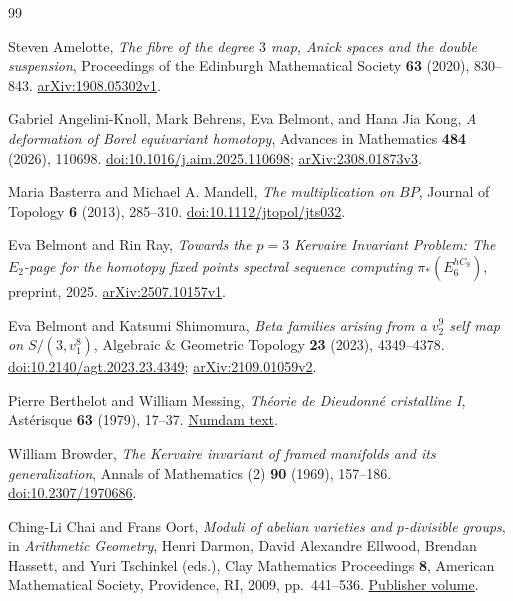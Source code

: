 \documentclass[11pt]{article}
\theoremstyle{definition}
\theoremstyle{remark}
\numberwithin{equation}{section}
\begin{document}
\begin{thebibliography}{99}

Steven Amelotte,
\emph{The fibre of the degree $3$ map, Anick spaces and the double suspension},
Proceedings of the Edinburgh Mathematical Society \textbf{63} (2020),
830--843.
\href{https://arxiv.org/abs/1908.05302v1}{arXiv:1908.05302v1}.

Gabriel Angelini-Knoll, Mark Behrens, Eva Belmont, and Hana Jia Kong,
\emph{A deformation of Borel equivariant homotopy},
Advances in Mathematics \textbf{484} (2026), 110698.
\href{https://doi.org/10.1016/j.aim.2025.110698}{doi:10.1016/j.aim.2025.110698};
\href{https://arxiv.org/abs/2308.01873v3}{arXiv:2308.01873v3}.

Maria Basterra and Michael A. Mandell,
\emph{The multiplication on $BP$},
Journal of Topology \textbf{6} (2013), 285--310.
\href{https://doi.org/10.1112/jtopol/jts032}{doi:10.1112/jtopol/jts032}.

Eva Belmont and Rin Ray,
\emph{Towards the $p=3$ Kervaire Invariant Problem:
The $E_2$-page for the homotopy fixed points spectral sequence computing
$\pi_*(E_6^{hC_9})$},
preprint, 2025.
\href{https://arxiv.org/abs/2507.10157v1}{arXiv:2507.10157v1}.

Eva Belmont and Katsumi Shimomura,
\emph{Beta families arising from a $v_2^9$ self map on $S/(3,v_1^8)$},
Algebraic \& Geometric Topology \textbf{23} (2023), 4349--4378.
\href{https://doi.org/10.2140/agt.2023.23.4349}{doi:10.2140/agt.2023.23.4349};
\href{https://arxiv.org/abs/2109.01059v2}{arXiv:2109.01059v2}.

Pierre Berthelot and William Messing,
\emph{Th\'eorie de Dieudonn\'e cristalline I},
Ast\'erisque \textbf{63} (1979), 17--37.
\href{https://www.numdam.org/item/AST_1979__63__17_0/}{Numdam text}.

William Browder,
\emph{The Kervaire invariant of framed manifolds and its generalization},
Annals of Mathematics (2) \textbf{90} (1969), 157--186.
\href{https://doi.org/10.2307/1970686}{doi:10.2307/1970686}.

Ching-Li Chai and Frans Oort,
\emph{Moduli of abelian varieties and $p$-divisible groups},
in \emph{Arithmetic Geometry},
Henri Darmon, David Alexandre Ellwood, Brendan Hassett,
and Yuri Tschinkel (eds.),
Clay Mathematics Proceedings \textbf{8},
American Mathematical Society, Providence, RI, 2009, pp.~441--536.
\href{https://www.claymath.org/library/proceedings/cmip08c.pdf}{Publisher volume}.


\end{thebibliography}
\end{document}
